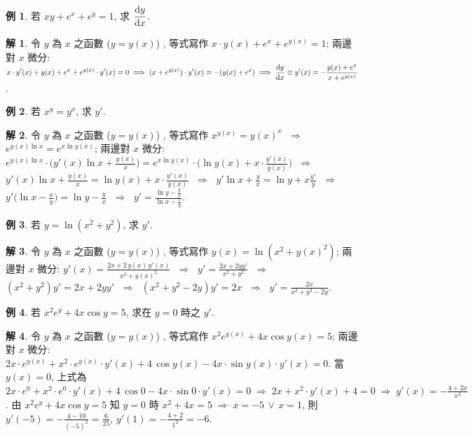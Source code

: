 \documentclass[12pt]{extarticle}
\newcommand{\ds}{\displaystyle}
\newcommand{\ie}{\;\Longrightarrow\;}
\newcommand{\diff}[2]{ \frac{\mathrm{d}\hfil#1\hfil}{\mathrm{d}#2}}
\theoremstyle{definition}
\newtheorem*{ex}{例}
\newtheorem*{sol}{解}
\begin{document}
\begin{ex}
  若 $\ds xy + e^x + e^y = 1$, 求 $\ds\diff{y}{x}$.     
\end{ex}

\begin{sol}
  令 $y$ 為 $x$ 之函數 ($y = y(x)$) , 等式寫作 $\ds x\cdot y(x) + e^x + e^{y(x)} = 1$; 兩邊對 $x$ 微分: $\ds x\cdot y'(x) + y(x) + e^x + e^{y(x)}\cdot y'(x) = 0 \ie (x + e^{y(x)})\cdot y'(x) = -(y(x) + e^x) \ie \diff{y}{x} \equiv y'(x) = -\frac{y(x) + e^x}{x + e^{y(x)}}$. 
\end{sol}

\begin{ex}
  若 $\ds x^y = y^x$, 求 $y'$.     
\end{ex}

\begin{sol}
  令 $y$ 為 $x$ 之函數 ($y = y(x)$) , 等式寫作 $\ds x^{y(x)} = {y(x)}^x$ $\ie$ $\ds e^{y(x)\ln x} = e^{x\ln y(x)}$; 兩邊對 $x$ 微分: $\ds e^{y(x)\ln x}\cdot\Big(y'(x)\ln x + \frac{y(x)}{x}\Big) = e^{x\ln y(x)}\cdot\Big(\ln y(x) + x\cdot\frac{y'(x)}{y(x)}\Big)$ $\ie$ $\ds y'(x)\ln x + \frac{y(x)}{x} = \ln y(x) + x\cdot\frac{y'(x)}{y(x)}$ $\ie$ $\ds y'\ln x + \frac{y}{x} = \ln y + x\frac{y'}{y}$ $\ie$ $\ds y'\Big(\ln x - \frac{x}{y}\Big) = \ln y - \frac{y}{x}$ $\ie$ $\ds y' = \frac{\ln y - \frac{y}{x}}{\ln x - \frac{x}{y}}$. 
\end{sol}

\begin{ex}
  若 $\ds y = \ln(x^2 + y^2)$, 求 $y'$.     
\end{ex}

\begin{sol}
  令 $y$ 為 $x$ 之函數 ($y = y(x)$) , 等式寫作 $\ds y(x) = \ln\left(x^2 + y(x)^2\right)$; 兩邊對 $x$ 微分: $\ds y'(x) = \frac{2 x + 2\,y(x)\,y'(x)}{x^2 + y(x)^2}$ $\ie$ $\ds y' = \frac{2 x + 2 y y'}{x^2 + y^2}$ $\ie$ $\ds (x^2 + y^2) y' = 2x + 2y y'$ $\ie$ $\ds(x^2 + y^2 - 2y)y' = 2x$ $\ie$ $\ds y' = \frac{2x}{x^2 + y^2 - 2y}$.
\end{sol}

\begin{ex}
  若 $\ds x^2 e^y + 4x\cos y = 5$, 求在 $y = 0$ 時之 $\ds y'$.     
\end{ex}

\begin{sol}
  令 $y$ 為 $x$ 之函數 ($y = y(x)$) , 等式寫作 $\ds x^2 e^{y(x)} + 4x\cos{y(x)} = 5$; 兩邊對 $x$ 微分: $\ds 2x\cdot e^{y(x)} + x^2\cdot e^{y(x)}\cdot y'(x) + 4\,\cos{y(x)} - 4x\cdot\sin{y(x)}\cdot y'(x) = 0$. 當 $y(x) = 0$, 上式為 $\ds 2x\cdot e^{0} + x^2\cdot e^{0}\cdot y'(x) + 4\,\cos{0} - 4x\cdot\sin{0}\cdot y'(x) = 0 \ie 2x + x^2\cdot y'(x) + 4 = 0 \ie y'(x) = -\frac{4 + 2x}{x^2}$. 由 $\ds x^2 e^y + 4x\cos y = 5$ 知 $y = 0$ 時 $\ds x^2 + 4x = 5\ie x = -5\,\vee\,x = 1$, 則 $\ds y'(-5) = -\frac{4 - 10}{(-5)^2} = \frac{6}{25}$, $\ds y'(1) = -\frac{4 + 2}{1^2} = -6$. 
\end{sol}
\end{document}

